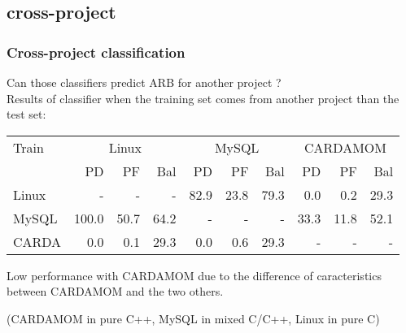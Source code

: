 \subsection{cross-project}
\begin{frame}
 \frametitle{Cross-project classification}
 \alert{Can those classifiers predict ARB for another project ?}\\
 Results of classifier when the training set comes from another project than the test set:
 \begin{center}
 \begin{tabular}{l|r r r|r r r|r r r}
  Train & \multicolumn{3}{c}{Linux} & \multicolumn{3}{c}{MySQL} & \multicolumn{3}{c}{CARDAMOM}\\
  ~ & PD & PF & Bal & PD & PF & Bal & PD & PF & Bal\\
  \hline
  Linux & - & - & - & 82.9 & 23.8 & 79.3 & 0.0 & 0.2 & 29.3\\
  MySQL & 100.0 & 50.7 & 64.2 & - & - & - & 33.3 & 11.8 & 52.1\\
  CARDA & 0.0 & 0.1 & 29.3 & 0.0 & 0.6 & 29.3 & - & - & -\\
  \hline
 \end{tabular}
 \end{center}
 Low performance with CARDAMOM due to the difference of caracteristics between CARDAMOM and the two others. %
 \begin{center}
  (CARDAMOM in pure C++, MySQL in mixed C/C++, Linux in pure C)
 \end{center}
\end{frame}
